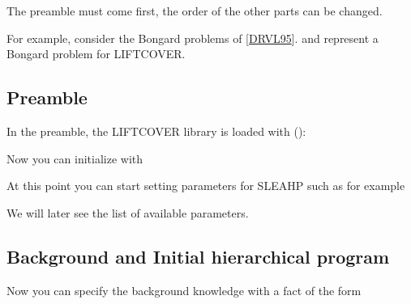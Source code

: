 \documentclass[letterpaper,10pt,english]{sphinxmanual}
\begin{document}
\sphinxAtStartPar
The preamble must come first, the order of the other parts can be changed.

\sphinxAtStartPar
For example, consider the Bongard problems of {[}\hyperlink{cite.index:id21}{DRVL95}{]}.  and  represent a Bongard problem for LIFTCOVER.


\subsection{Preamble}
\label{\detokenize{index:preamble}}
\sphinxAtStartPar
In the preamble, the LIFTCOVER library is loaded with ():

\begin{sphinxVerbatim}[commandchars=\\\{\}]
 
\end{sphinxVerbatim}

\sphinxAtStartPar
Now you can initialize  with

\begin{sphinxVerbatim}[commandchars=\\\{\}]
 
\end{sphinxVerbatim}

\sphinxAtStartPar
At this point you can start setting parameters for SLEAHP such as for example

\begin{sphinxVerbatim}[commandchars=\\\{\}]
 
 
 
\end{sphinxVerbatim}

\sphinxAtStartPar
We will later see the list of available parameters.


\subsection{Background and Initial hierarchical program}
\label{\detokenize{index:background-and-initial-hierarchical-program}}
\sphinxAtStartPar
Now you can specify the background knowledge with a fact of the form
\end{document}
